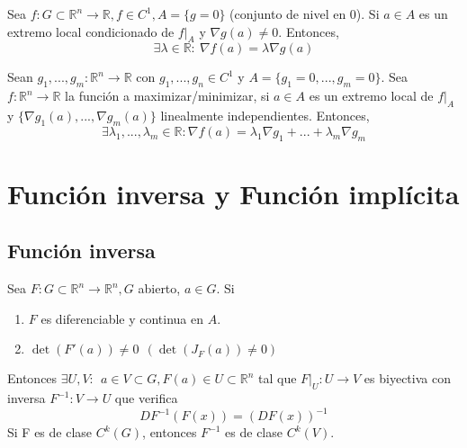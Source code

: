 \begin{prop}
Sea $f:G\subset\mathbb{R}^n\rightarrow\mathbb{R}, f\in C^1, A=\{g=0\}$ (conjunto de nivel en $0$). Si $a\in A$ es un extremo local condicionado de $\left.f\right|_A$ y $\nabla{g}(a)\neq 0$. Entonces, \[ \exists \lambda \in \mathbb{R}: \ \nabla{f(a)} = \lambda \nabla{g}(a)\]
\end{prop}

\begin{theo}
Sean $g_1,...,g_m:\mathbb{R}^n\rightarrow\mathbb{R}$ con $g_1,...,g_n \in C^1$ y $A = \{ g_1 = 0, ..., g_m = 0\}$. Sea $f:\mathbb{R}^n\rightarrow\mathbb{R}$ la función a maximizar/minimizar, si $a\in A$ es un extremo local de $\left.f\right|_A$ y $\{\nabla{g_1}(a),...,\nabla{g_m}(a)\}$ linealmente independientes. Entonces, \[ \exists \lambda_1,...,\lambda_m \in \mathbb{R}: \nabla{f}(a) = \lambda_1\nabla{g_1} + ... + \lambda_m\nabla{g_m}\]
\end{theo}

\begin{dem}

\end{dem}

\chapter{Función inversa y Función implícita}

\section{Función inversa}

\begin{theo}
Sea $F:G\subset\mathbb{R}^n\rightarrow\mathbb{R}^n, G$ abierto, $a\in G$. Si

\begin{enumerate}[label=(\roman*)]
    \item $F$ es diferenciable y continua en $A$. 
    \item $\det(F'(a)) \neq 0 \ \ (\det(J_F(a))\neq 0)$ 
\end{enumerate}

Entonces $\exists U,V: \ \ a\in V\subset G, F(a)\in U\subset\mathbb{R}^n$ tal que $\left.F\right|_U: U \rightarrow V$ es biyectiva con inversa $ F^{-1}: V \rightarrow U$ que verifica \[ DF^{-1}(F(x)) = (DF(x))^{-1} \] Si F es de clase $ C^k(G)$, entonces $F^{-1}$ es de clase $C^k(V)$.
\end{theo}

